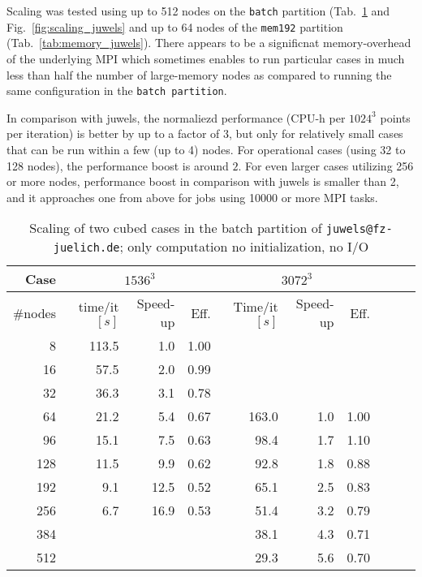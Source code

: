 Scaling was tested using up to 512 nodes on the \texttt{batch} partition (Tab.~\ref{tab:scaling_juwels} and Fig.~\ref{fig:scaling_juwels}
and up to 64 nodes of the \texttt{mem192} partition (Tab.~\ref{tab:memory_juwels}).
There appears to be a significnat memory-overhead of the underlying MPI
which sometimes enables to run particular cases in much less than half the number of large-memory nodes as compared
to running the same configuration in the \texttt{batch partition}.

In comparison with juwels, the normaliezd performance (CPU-h per $1024^3$ points per iteration) is better by up to a factor of $3$, but only for relatively small cases that can be run within a few (up to 4) nodes. For operational cases (using 32 to 128 nodes), the performance boost is around $2$. For even larger cases utilizing 256 or more nodes, performance boost in comparison with juwels is smaller than 2, and it approaches one from above for jobs using 10000 or more MPI tasks.
%
\begin{table}
  \caption{Scaling of two cubed cases in the batch partition of \texttt{juwels@fz-juelich.de}; only computation no initialization, no I/O}
  {\footnotesize\begin{tabular}{r | r r r | r r r | rrr}
    \toprule
    Case   & \multicolumn{3}{c|}{$1536^3$} & \multicolumn{3}{c}{$3072^3$}\\
    \midrule
    \#nodes&        time/it $[s]$ & Speed-up & Eff. & Time/it $[s]$ & Speed-up & Eff.\\
    \midrule
                        8 &      113.5&   1.0&  1.00 \\
    \rowcolor{gray!20} 16&        57.5&   2.0&  0.99\\
                       32&        36.3&   3.1&  0.78\\
    \rowcolor{gray!20} 64&        21.2&   5.4&  0.67& 163.0& 1.0& 1.00\\
                       96&        15.1&   7.5&  0.63&  98.4& 1.7& 1.10\\
    \rowcolor{gray!20}128&        11.5&   9.9&  0.62&  92.8& 1.8& 0.88\\
                      192&         9.1&  12.5&  0.52&  65.1& 2.5& 0.83\\
    \rowcolor{gray!20}256&         6.7&  16.9&  0.53&  51.4& 3.2& 0.79\\
                      384&                        &&&  38.1& 4.3& 0.71\\
    \rowcolor{gray!20}512&                        &&&  29.3& 5.6& 0.70\\
    \bottomrule
  \end{tabular}}
  \label{tab:scaling_juwels}
\end{table}

